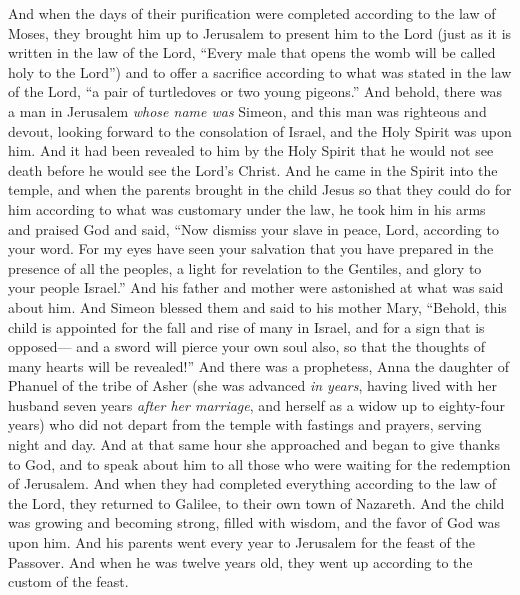 \begin{biblechapter}
 And when the days of their purification were completed according to the law of Moses, they brought him up to Jerusalem to present him to the Lord
\verse (just as it is written in the law of the Lord, “Every male that opens the womb will be called holy to the Lord”)
\verse and to offer a sacrifice according to what was stated in the law of the Lord, “a pair of turtledoves or two young pigeons.”
 And behold, there was a man in Jerusalem \textit{whose name was} Simeon, and this man was righteous and devout, looking forward to the consolation of Israel, and the Holy Spirit was upon him.
\verse And it had been revealed to him by the Holy Spirit that he would not see death before he would see the Lord’s Christ.
\verse And he came in the Spirit into the temple, and when the parents brought in the child Jesus so that they could do for him according to what was customary under the law,
\verse he took him in his arms and praised God and said,
\verse “Now dismiss your slave in peace, Lord, 
according to your word.
\verse For my eyes have seen your salvation
\verse that you have prepared in the presence of all the peoples,
\verse a light for revelation to the Gentiles, 
and glory to your people Israel.”
\verse And his father and mother were astonished at what was said about him.
\verse And Simeon blessed them and said to his mother Mary, “Behold, this child is appointed for the fall and rise of many in Israel, and for a sign that is opposed—
\verse and a sword will pierce your own soul also, so that the thoughts of many hearts will be revealed!”
 And there was a prophetess, Anna the daughter of Phanuel of the tribe of Asher (she was advanced \textit{in years}, having lived with her husband seven years \textit{after her marriage},
\verse and herself as a widow up to eighty-four years) who did not depart from the temple with fastings and prayers, serving night and day.
\verse And at that same hour she approached and began to give thanks to God, and to speak about him to all those who were waiting for the redemption of Jerusalem.
\verse And when they had completed everything according to the law of the Lord, they returned to Galilee, to their own town of Nazareth.
\verse And the child was growing and becoming strong, filled with wisdom, and the favor of God was upon him.
 And his parents went every year to Jerusalem for the feast of the Passover.
\verse And when he was twelve years old, they went up according to the custom of the feast.

\end{biblechapter}
